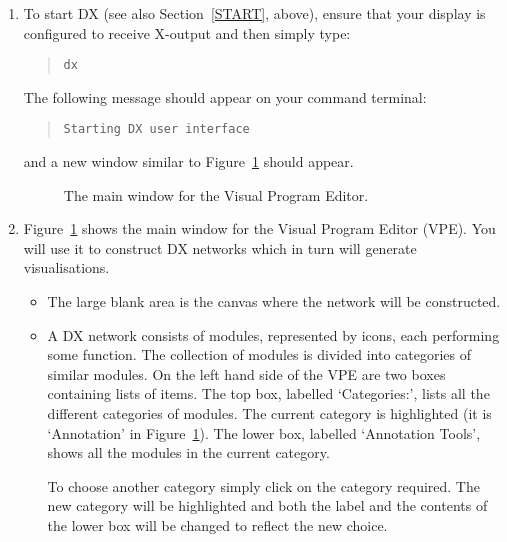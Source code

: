 \begin{enumerate}

  \item To start DX (see also Section~\ref{START}, above), ensure that 
   your display is configured to receive X-output and then simply type:

  \begin{quote}
   {\tt dx}
  \end{quote}

   The following message should appear on your command terminal:

  \begin{quote}
   {\tt Starting DX user interface}
  \end{quote}

   and a new window similar to Figure~\ref{VPE} should appear.

  \begin{figure}[htbp]
  \label{VPE}

  \begin{center}
  \leavevmode
  \epsfxsize=450pt
  \end{center}

  \caption[The main window for the Visual Program Editor.]{The main 
   window for the Visual Program Editor.}
  
  \end{figure}

  \item Figure~\ref{VPE} shows the main window for the Visual Program
   Editor (VPE). You will use it to construct DX networks which in turn
   will generate visualisations.

  \begin{itemize}

    \item The large blank area is the canvas where the network will be
     constructed.

    \item A DX network consists of modules, represented by icons, each
     performing some function. The collection of modules is divided
     into categories of similar modules. On the left hand side of the
     VPE are two boxes containing lists of items. The top box, labelled
     `Categories:', lists all the different categories of modules. The
     current category is highlighted (it is `Annotation' in
     Figure~\ref{VPE}). The lower box, labelled `Annotation Tools',
     shows all the modules in the current category.

     To choose another category simply click on the category required.
     The new category will be highlighted and both the label and the
     contents of the lower box will be changed to reflect the new
     choice.


\end{itemize}
\end{enumerate}
